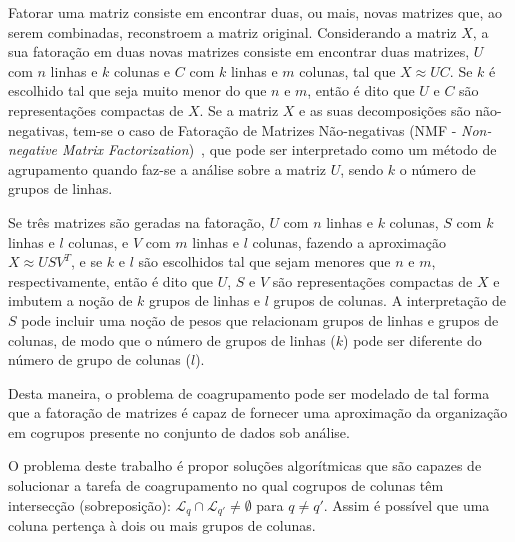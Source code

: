 \documentclass[
    12pt,                %
    oneside,            %
    a4paper,            %
    english,            %
    brazil                %
    ]{abntex2ppgsi}
\begin{document}
Fatorar uma matriz consiste em encontrar duas, ou mais, novas matrizes que, ao serem combinadas, reconstroem a matriz original.
Considerando a matriz $X$, a sua fatoração em duas novas matrizes consiste em encontrar duas matrizes, $U$ com $n$ linhas e $k$ colunas e $C$ com $k$ linhas e $m$ colunas, tal que $X \approx UC$.
Se $k$ é escolhido tal que seja muito menor do que $n$ e $m$, então é dito que $U$ e $C$ são representações compactas de $X$.
Se a matriz $X$ e as suas decomposições são não-negativas, tem-se o caso de Fatoração de Matrizes Não-negativas (NMF - \textit{Non-negative Matrix Factorization})~\cite{lee:nnmf00}, que pode ser interpretado como um método de agrupamento quando faz-se a análise sobre a matriz $U$, sendo $k$ o número de grupos de linhas.

Se três matrizes são geradas na fatoração, $U$ com $n$ linhas e $k$ colunas, $S$ com $k$ linhas e $l$ colunas, e $V$ com $m$ linhas e $l$ colunas, fazendo a aproximação $X \approx USV^T$, e se $k$ e $l$ são escolhidos tal que sejam menores que $n$ e $m$, respectivamente, então é dito que $U$, $S$ e $V$ são representações compactas de $X$ e imbutem a noção de $k$ grupos de linhas e $l$ grupos de colunas.
A interpretação de $S$ pode incluir uma noção de pesos que relacionam grupos de linhas e grupos de colunas, de modo que o número de grupos de linhas ($k$) pode ser diferente do número de grupo de colunas ($l$).

Desta maneira, o problema de coagrupamento pode ser modelado de tal forma que a fatoração de matrizes é capaz de fornecer uma aproximação da organização em cogrupos presente no conjunto de dados sob análise.

O problema deste trabalho é propor soluções algorítmicas que são capazes de solucionar a tarefa de coagrupamento no qual cogrupos de colunas têm intersecção (sobreposição): $\mathcal{L}_q \cap \mathcal{L}_{q'} \neq \emptyset$ para $q \neq q'$.
Assim é possível que uma coluna pertença à dois ou mais grupos de colunas.



\end{document}
